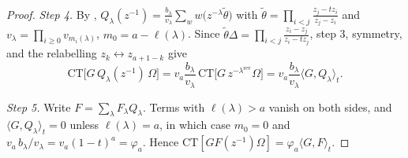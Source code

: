 \documentclass[11pt]{amsart}
\theoremstyle{definition}
\theoremstyle{remark}
\numberwithin{equation}{section}
\begin{document}
\begin{proof}
\emph{Step 4.} By \cite[III (2.1)--(2.2)]{Macdonald95}, $Q_\lambda(z^{-1})=\frac{b_\lambda}{v_\lambda}\sum_ww\bigl(z^{-\lambda}\tilde\theta\bigr)$ with $\tilde\theta=\prod_{i<j}\frac{z_j-tz_i}{z_j-z_i}$ and $v_\lambda=\prod_{i\ge0}v_{m_i(\lambda)}$, $m_0=a-\ell(\lambda)$. Since $\tilde\theta\Delta=\prod_{i<j}\frac{z_i-z_j}{z_i-tz_j}$, step 3, symmetry, and the relabelling $z_k\leftrightarrow z_{a+1-k}$ give
\[ \mathrm{CT}\bigl[G\,Q_\lambda(z^{-1})\,\Omega\bigr]=v_a\frac{b_\lambda}{v_\lambda}\,\mathrm{CT}\bigl[G\,z^{-\lambda^{\mathrm{rev}}}\Omega\bigr]=v_a\frac{b_\lambda}{v_\lambda}\langle G,Q_\lambda\rangle_t . \]

\emph{Step 5.} Write $F=\sum_\lambda F_\lambda Q_\lambda$. Terms with $\ell(\lambda)>a$ vanish on both sides, and $\langle G,Q_\lambda\rangle_t=0$ unless $\ell(\lambda)=a$, in which case $m_0=0$ and $v_a\,b_\lambda/v_\lambda=v_a(1-t)^a=\varphi_a$. Hence $\mathrm{CT}[GF(z^{-1})\Omega]=\varphi_a\langle G,F\rangle_t$.
\end{proof}
\end{document}
